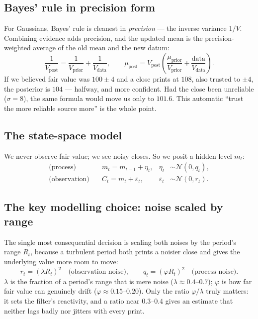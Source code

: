 \documentclass[11pt]{article}
\begin{document}
\subsection{Bayes' rule in precision form}
For Gaussians, Bayes' rule is cleanest in \emph{precision} --- the inverse variance $1/V$.
Combining evidence adds precision, and the updated mean is the precision-weighted average of the
old mean and the new datum:
\begin{equation}
\frac{1}{V_{\text{post}}}=\frac{1}{V_{\text{prior}}}+\frac{1}{V_{\text{data}}},
\qquad
\mu_{\text{post}}=V_{\text{post}}\left(\frac{\mu_{\text{prior}}}{V_{\text{prior}}}
+\frac{\text{data}}{V_{\text{data}}}\right).
\end{equation}
If we believed fair value was $100\pm4$ and a close prints at $108$, also trusted to $\pm4$, the
posterior is $104$ --- halfway, and more confident. Had the close been unreliable ($\sigma=8$),
the same formula would move us only to $101.6$. This automatic ``trust the more reliable source
more'' is the whole point.

\subsection{The state-space model}
We never observe fair value; we see noisy closes. So we posit a hidden level $m_t$:
\begin{align}
\text{(process)}\quad & m_t=m_{t-1}+\eta_t, & \eta_t &\sim\mathcal N(0,q_t),\\
\text{(observation)}\quad & C_t=m_t+\varepsilon_t, & \varepsilon_t &\sim\mathcal N(0,r_t).
\end{align}

\subsection{The key modelling choice: noise scaled by range}
The single most consequential decision is scaling both noises by the period's range $R_t$,
because a turbulent period both prints a noisier close and gives the underlying value more room
to move:
\begin{equation}
r_t=(\lambda R_t)^2 \quad\text{(observation noise)},\qquad
q_t=(\varphi R_t)^2 \quad\text{(process noise)}.
\end{equation}
$\lambda$ is the fraction of a period's range that is mere noise ($\lambda\approx0.4$--$0.7$);
$\varphi$ is how far fair value can genuinely drift ($\varphi\approx0.15$--$0.20$). Only the
ratio $\varphi/\lambda$ truly matters: it sets the filter's reactivity, and a ratio near
$0.3$--$0.4$ gives an estimate that neither lags badly nor jitters with every print.
\end{document}
